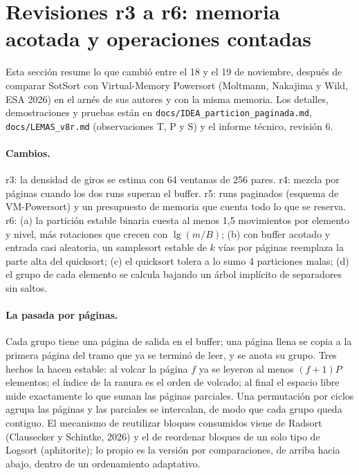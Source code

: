 \documentclass[10pt,a4paper]{article}
\begin{document}
\section{Revisiones r3 a r6: memoria acotada y operaciones contadas}\label{sec:r6}
Esta sección resume lo que cambió entre el 18 y el 19 de noviembre, después de comparar SotSort
con Virtual-Memory Powersort (Moltmann, Nakajima y Wild, ESA 2026) en el arnés de sus autores y
con la misma memoria. Los detalles, demostraciones y pruebas están en
\texttt{docs/IDEA\_particion\_paginada.md}, \texttt{docs/LEMAS\_v8r.md} (observaciones T, P y S)
y el informe técnico, revisión 6.

\paragraph{Cambios.} r3: la densidad de giros se estima con 64 ventanas de 256 pares. r4: mezcla
por páginas cuando los dos runs superan el buffer. r5: runs paginados (esquema de VM-Powersort) y
un presupuesto de memoria que cuenta todo lo que se reserva. r6: (a) la partición estable binaria
cuesta al menos 1{,}5 movimientos por elemento y nivel, más rotaciones que crecen con
$\lg(m/B)$; (b) con buffer acotado y entrada casi aleatoria, un samplesort estable de $k$ vías por
páginas reemplaza la parte alta del quicksort; (c) el quicksort tolera a lo sumo 4 particiones
malas; (d) el grupo de cada elemento se calcula bajando un árbol implícito de separadores sin
saltos.

\paragraph{La pasada por páginas.} Cada grupo tiene una página de salida en el buffer; una página
llena se copia a la primera página del tramo que ya se terminó de leer, y se anota su grupo. Tres
hechos la hacen estable: al volcar la página $f$ ya se leyeron al menos $(f+1)P$ elementos; el
índice de la ranura es el orden de volcado; al final el espacio libre mide exactamente lo que
suman las páginas parciales. Una permutación por ciclos agrupa las páginas y las parciales se
intercalan, de modo que cada grupo queda contiguo. El mecanismo de reutilizar bloques consumidos
viene de Radsort (Clausecker y Schintke, 2026) y el de reordenar bloques de un solo tipo de
Logsort (aphitorite); lo propio es la versión por comparaciones, de arriba hacia abajo, dentro de
un ordenamiento adaptativo.
\end{document}
